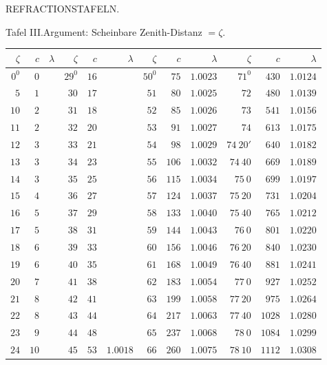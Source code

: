 \begin{center}
{\small REFRACTIONSTAFELN.\par}
\medskip
Tafel III.\quad Argument: Scheinbare Zenith-Distanz $=\zeta$.
\medskip
{\fontsize{9}{11}\selectfont\setlength{\tabcolsep}{3pt}
\begin{tabular}{r|r|r||r|r|r||r|r|r||r|r|r}
$\zeta$&$c$&$\lambda$&$\zeta$&$c$&$\lambda$&$\zeta$&$c$&$\lambda$&$\zeta$&$c$&$\lambda$\\\hline
$0^0$ & $0$ &  & $29^0$ & $16$ &  & $50^0$ & $75$ & $1.0023$ & $71^0$ & $430$ & $1.0124$\\
$5$ & $1$ &  & $30$ & $17$ &  & $51$ & $80$ & $1.0025$ & $72$ & $480$ & $1.0139$\\
$10$ & $2$ &  & $31$ & $18$ &  & $52$ & $85$ & $1.0026$ & $73$ & $541$ & $1.0156$\\
$11$ & $2$ &  & $32$ & $20$ &  & $53$ & $91$ & $1.0027$ & $74$ & $613$ & $1.0175$\\
$12$ & $3$ &  & $33$ & $21$ &  & $54$ & $98$ & $1.0029$ & $74\ 20'$ & $640$ & $1.0182$\\
$13$ & $3$ &  & $34$ & $23$ &  & $55$ & $106$ & $1.0032$ & $74\ 40$ & $669$ & $1.0189$\\
$14$ & $3$ &  & $35$ & $25$ &  & $56$ & $115$ & $1.0034$ & $75\ 0$ & $699$ & $1.0197$\\
$15$ & $4$ &  & $36$ & $27$ &  & $57$ & $124$ & $1.0037$ & $75\ 20$ & $731$ & $1.0204$\\
$16$ & $5$ &  & $37$ & $29$ &  & $58$ & $133$ & $1.0040$ & $75\ 40$ & $765$ & $1.0212$\\
$17$ & $5$ &  & $38$ & $31$ &  & $59$ & $144$ & $1.0043$ & $76\ 0$ & $801$ & $1.0220$\\
$18$ & $6$ &  & $39$ & $33$ &  & $60$ & $156$ & $1.0046$ & $76\ 20$ & $840$ & $1.0230$\\
$19$ & $6$ &  & $40$ & $35$ &  & $61$ & $168$ & $1.0049$ & $76\ 40$ & $881$ & $1.0241$\\
$20$ & $7$ &  & $41$ & $38$ &  & $62$ & $183$ & $1.0054$ & $77\ 0$ & $927$ & $1.0252$\\
$21$ & $8$ &  & $42$ & $41$ &  & $63$ & $199$ & $1.0058$ & $77\ 20$ & $975$ & $1.0264$\\
$22$ & $8$ &  & $43$ & $44$ &  & $64$ & $217$ & $1.0063$ & $77\ 40$ & $1028$ & $1.0280$\\
$23$ & $9$ &  & $44$ & $48$ &  & $65$ & $237$ & $1.0068$ & $78\ 0$ & $1084$ & $1.0299$\\
$24$ & $10$ &  & $45$ & $53$ & $1.0018$ & $66$ & $260$ & $1.0075$ & $78\ 10$ & $1112$ & $1.0308$\\

\end{tabular}}
\end{center}
